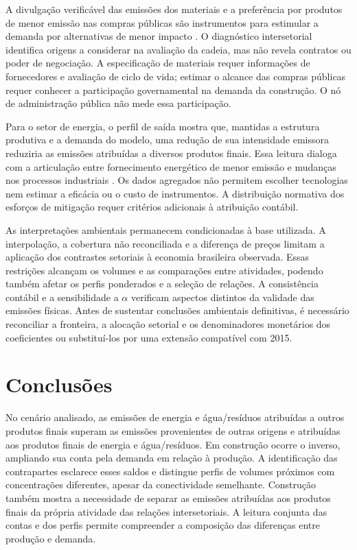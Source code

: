 \documentclass[11pt]{article}
\begin{document}
A divulgação verificável das emissões dos materiais e a preferência por produtos de menor emissão nas compras públicas são instrumentos para estimular a demanda por alternativas de menor impacto \parencite[seções~6.6 e~6.7]{rissman2020}. O diagnóstico intersetorial identifica origens a considerar na avaliação da cadeia, mas não revela contratos ou poder de negociação. A especificação de materiais requer informações de fornecedores e avaliação de ciclo de vida; estimar o alcance das compras públicas requer conhecer a participação governamental na demanda da construção. O nó de administração pública não mede essa participação.

Para o setor de energia, o perfil de saída mostra que, mantidas a estrutura produtiva e a demanda do modelo, uma redução de sua intensidade emissora reduziria as emissões atribuídas a diversos produtos finais. Essa leitura dialoga com a articulação entre fornecimento energético de menor emissão e mudanças nos processos industriais \parencite[seções~4.2 e~7.2]{rissman2020}. Os dados agregados não permitem escolher tecnologias nem estimar a eficácia ou o custo de instrumentos. A distribuição normativa dos esforços de mitigação requer critérios adicionais à atribuição contábil.

As interpretações ambientais permanecem condicionadas à base utilizada. A interpolação, a cobertura não reconciliada e a diferença de preços limitam a aplicação dos contrastes setoriais à economia brasileira observada. Essas restrições alcançam os volumes e as comparações entre atividades, podendo também afetar os perfis ponderados e a seleção de relações. A consistência contábil e a sensibilidade a $\alpha$ verificam aspectos distintos da validade das emissões físicas. Antes de sustentar conclusões ambientais definitivas, é necessário reconciliar a fronteira, a alocação setorial e os denominadores monetários dos coeficientes ou substituí-los por uma extensão compatível com 2015.


\section{Conclusões}

No cenário analisado, as emissões de energia e água/resíduos atribuídas a outros produtos finais superam as emissões provenientes de outras origens e atribuídas aos produtos finais de energia e água/resíduos. Em construção ocorre o inverso, ampliando sua conta pela demanda em relação à produção. A identificação das contrapartes esclarece esses saldos e distingue perfis de volumes próximos com concentrações diferentes, apesar da conectividade semelhante. Construção também mostra a necessidade de separar as emissões atribuídas aos produtos finais da própria atividade das relações intersetoriais. A leitura conjunta das contas e dos perfis permite compreender a composição das diferenças entre produção e demanda.
\end{document}
